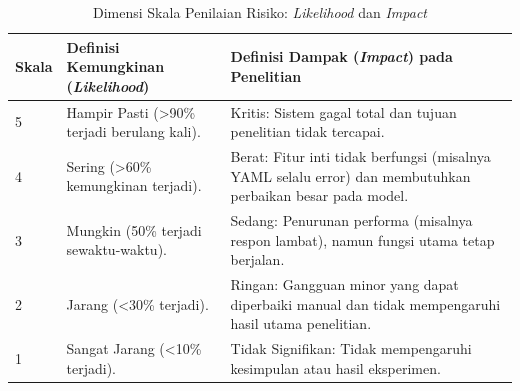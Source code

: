 \begin{table}[H]
\centering
\renewcommand{\arraystretch}{1.25}
\captionsetup{justification=raggedright,singlelinecheck=false}

\begin{tabular}{|p{1cm}|p{6cm}|p{6cm}|}
\hline
\textbf{Skala} &
\textbf{Definisi Kemungkinan (\textit{Likelihood})} &
\textbf{Definisi Dampak (\textit{Impact}) pada Penelitian} \\ \hline

5 & Hampir Pasti (>90\% terjadi berulang kali). &
Kritis: Sistem gagal total dan tujuan penelitian tidak tercapai. \\ \hline

4 & Sering (>60\% kemungkinan terjadi). &
Berat: Fitur inti tidak berfungsi (misalnya YAML selalu error) dan membutuhkan perbaikan besar pada model. \\ \hline

3 & Mungkin (50\% terjadi sewaktu-waktu). &
Sedang: Penurunan performa (misalnya respon lambat), namun fungsi utama tetap berjalan. \\ \hline

2 & Jarang (<30\% terjadi). &
Ringan: Gangguan minor yang dapat diperbaiki manual dan tidak mempengaruhi hasil utama penelitian. \\ \hline

1 & Sangat Jarang (<10\% terjadi). &
Tidak Signifikan: Tidak mempengaruhi kesimpulan atau hasil eksperimen. \\ \hline

\end{tabular}
\caption{Dimensi Skala Penilaian Risiko: \textit{Likelihood} dan \textit{Impact}}
\label{tbl:risk_scale}
\end{table}